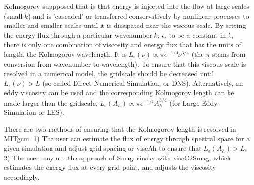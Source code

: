 Kolmogorov suppposed that is that energy is injected into the flow at
large scales (small $k$) and is 'cascaded' or transferred
conservatively by nonlinear processes to smaller and smaller scales
until it is dissipated near the viscous scale.  By setting the energy
flux through a particular wavenumber $k$, $\epsilon$, to be a constant
in $k$, there is only one combination of viscosity and energy flux
that has the units of length, the Kolmogorov wavelength.  It is
$L_\epsilon(\nu)\propto\pi\epsilon^{-1/4}\nu^{3/4}$ (the $\pi$ stems
from conversion from wavenumber to wavelength).  To ensure that this
viscous scale is resolved in a numerical model, the gridscale should
be decreased until $L_\epsilon(\nu)>L$ (so-called Direct Numerical
Simulation, or DNS).  Alternatively, an eddy viscosity can be used and
the corresponding Kolmogorov length can be made larger than the
gridscale, $L_\epsilon(A_h)\propto\pi\epsilon^{-1/4}A_h^{3/4}$ (for
Large Eddy Simulation or LES).

There are two methods of ensuring that the Kolmogorov length is
resolved in MITgcm.  1) The user can estimate the flux of energy
through spectral space for a given simulation and adjust grid spacing
or {\sf viscAh} to ensure that $L_\epsilon(A_h)>L$.  2) The user may
use the approach of Smagorinsky with {\sf viscC2Smag}, which estimates
the energy flux at every grid point, and adjusts the viscosity
accordingly.

